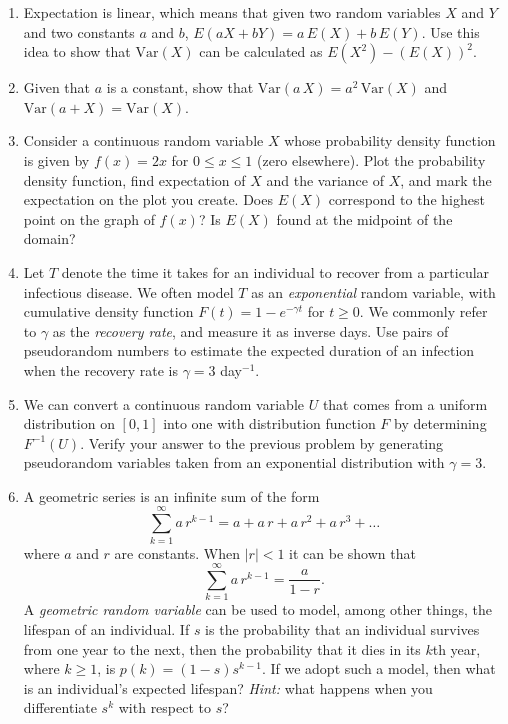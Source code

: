 \documentclass[11pt]{article}
\begin{document}
\begin{enumerate}
\begin{enumerate}
        \begin{enumerate}
          \item Find the appropriate value of $k$, and generate fifty independent values of $X$ using a computer.
          \item Determine the expectation and the variance of $X$. Verify your answers using the numbers generated in part (a).
        \end{enumerate}
      \item Expectation is linear, which means that given two random variables $X$ and $Y$ and two constants $a$ and $b$, $E(aX+bY) = a\, E(X) + b\, E(Y)$. Use this idea to show that $\text{Var}(X)$ can be calculated as $E(X^2) - (E(X))^2$.
      \item Given that $a$ is a constant, show that $\text{Var} (a\, X) = a^2\, \text{Var}(X)$ and $\text{Var}(a + X) = \text{Var}(X)$.
      \item Consider a continuous random variable $X$ whose probability density function is given by $f(x) = 2 x$ for $0\leq x \leq 1$ (zero elsewhere). Plot the probability density function, find expectation of $X$ and the variance of $X$, and mark the expectation on the plot you create. Does $E(X)$ correspond to the highest point on the graph of $f(x)$? Is $E(X)$ found at the midpoint of the domain?
      \item Let $T$ denote the time it takes for an individual to recover from a particular infectious disease. We often model $T$ as an {\it exponential} random variable, with cumulative density function $F(t) = 1 - e^{-\gamma t}$ for $t\geq 0$. We commonly refer to $\gamma$ as the {\it recovery rate}, and measure it as inverse days. Use pairs of pseudorandom numbers to estimate the expected duration of an infection when the recovery rate is $\gamma = 3$ day$^{-1}$. 
      \item We can convert a continuous random variable $U$ that comes from a uniform distribution on $[0,1]$ into one with distribution function $F$ by determining $F^{-1}(U)$. Verify your answer to the previous problem by generating pseudorandom variables taken from an exponential distribution with $\gamma = 3$.    
      \item A geometric series is an infinite sum of the form
        \[
          \sum_{k=1}^\infty a\, r^{k-1} = a + a\, r + a\, r^2 + a\, r^3 + \ldots
        \]
        where $a$ and $r$ are constants. When $|r|<1$ it can be shown that
        \[
          \sum_{k=1}^\infty a\, r^{k-1} = \frac{a}{1-r}.
        \]	
        A {\it geometric random variable} can be used to model, among other things, the lifespan of an individual. If $s$ is the probability that an individual survives from one year to the next, then the probability that it dies in its $k$th year, where $k\geq 1$, is $p(k) = (1-s) s^{k-1}$. If we adopt such a model, then what is an individual's expected lifespan? {\it Hint:} what happens when you differentiate $s^k$ with respect to $s$? 

\end{enumerate}
\end{enumerate}
\end{document}
